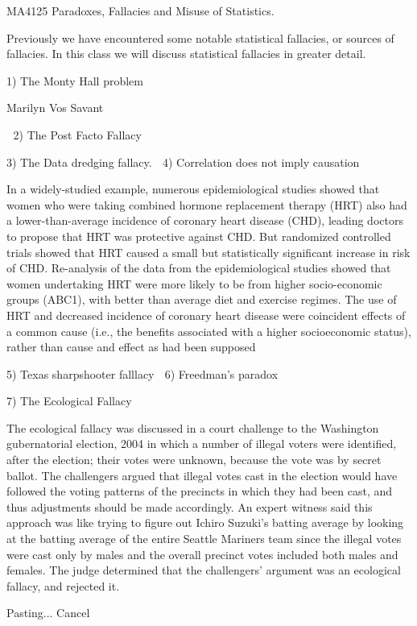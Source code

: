MA4125 Paradoxes, Fallacies and Misuse of Statistics.

Previously we have encountered some notable statistical fallacies, or sources of fallacies. In this class we will discuss statistical fallacies in greater detail.



1) The Monty Hall problem

Marilyn Vos Savant


2) The Post Facto Fallacy

3) The Data dredging fallacy.

4) Correlation does not imply causation

In a widely-studied example, numerous epidemiological studies showed that women who were taking combined hormone replacement therapy (HRT) also had a lower-than-average incidence of coronary heart disease (CHD), leading doctors to propose that HRT was protective against CHD. But randomized controlled trials showed that HRT caused a small but statistically significant increase in risk of CHD. Re-analysis of the data from the epidemiological studies showed that women undertaking HRT were more likely to be from higher socio-economic groups (ABC1), with better than average diet and exercise regimes. The use of HRT and decreased incidence of coronary heart disease were coincident effects of a common cause (i.e., the benefits associated with a higher socioeconomic status), rather than cause and effect as had been supposed

5) Texas sharpshooter falllacy

6) Freedman's paradox


7) The Ecological Fallacy
 

The ecological fallacy was discussed in a court challenge to the Washington
gubernatorial election, 2004 in which a number of illegal voters were identified,
after the election; their votes were unknown, because the vote was
by secret ballot. The challengers argued that illegal votes cast in
the election would have followed the voting patterns of the precincts
in which they had been cast, and thus adjustments should be made accordingly.
An expert witness said this approach was like trying to figure out Ichiro Suzuki's
batting average by looking at the batting average of the entire Seattle Mariners
team since the illegal votes were cast only by males and the overall precinct votes
included both males and females.
The judge determined that the challengers' argument was an ecological fallacy, and rejected it.


Pasting... Cancel
